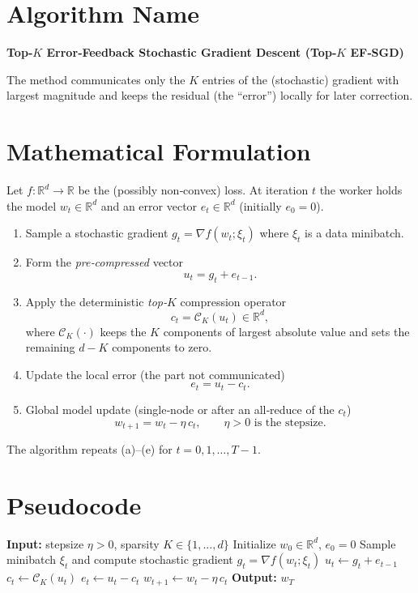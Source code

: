 \documentclass{article}
\newcommand{\R}{\mathbb{R}}
\newcommand{\cK}{\mathcal{C}_{K}}
\begin{document}
\section*{Algorithm Name}
\textbf{Top‑$K$ Error‑Feedback Stochastic Gradient Descent (Top‑$K$ EF‑SGD)}  

The method communicates only the $K$ entries of the (stochastic) gradient with largest magnitude and keeps the residual (the “error”) locally for later correction.

\section*{Mathematical Formulation}
Let $f:\R^{d}\!\to\!\R$ be the (possibly non‑convex) loss.  
At iteration $t$ the worker holds the model $w_{t}\in\R^{d}$ and an error vector $e_{t}\in\R^{d}$ (initially $e_{0}=0$).  

\begin{enumerate}[label=(\alph*)]
\item Sample a stochastic gradient $g_{t}= \nabla f(w_{t};\xi_{t})$ where $\xi_{t}$ is a data minibatch.
\item Form the \emph{pre‑compressed} vector
\[
u_{t}=g_{t}+e_{t-1}. \tag{1}
\]
\item Apply the deterministic \emph{top‑$K$} compression operator
\[
c_{t}= \cK(u_{t})\in\R^{d},
\]
where $\cK(\cdot)$ keeps the $K$ components of largest absolute value and sets the remaining $d-K$ components to zero.
\item Update the local error (the part not communicated)
\[
e_{t}=u_{t}-c_{t}. \tag{2}
\]
\item Global model update (single‑node or after an all‑reduce of the $c_{t}$)
\[
w_{t+1}= w_{t}-\eta\,c_{t}, \qquad \eta>0 \text{ is the stepsize}. \tag{3}
\]
\end{enumerate}

The algorithm repeats (a)–(e) for $t=0,1,\dots ,T-1$.

\section*{Pseudocode}
\begin{algorithm}[H]
\caption{Top‑$K$ EF‑SGD}
\begin{algorithmic}[1]
\State \textbf{Input:} stepsize $\eta>0$, sparsity $K\in\{1,\dots ,d\}$
\State Initialize $w_{0}\in\R^{d}$, $e_{0}=0$
    \State Sample minibatch $\xi_{t}$ and compute stochastic gradient $g_{t}= \nabla f(w_{t};\xi_{t})$
    \State $u_{t}\gets g_{t}+e_{t-1}$                         
    \State $c_{t}\gets \cK(u_{t})$                          
    \State $e_{t}\gets u_{t}-c_{t}$                         
    \State $w_{t+1}\gets w_{t}-\eta\,c_{t}$                 
\EndFor
\State \textbf{Output:} $w_{T}$
\end{algorithmic}
\end{algorithm}
\end{document}
